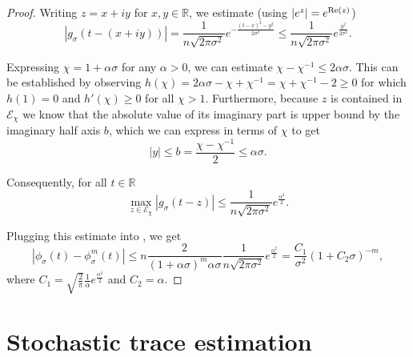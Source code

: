 \begin{proof}
    Writing $z = x + iy$ for $x,y \in \mathbb{R}$, we estimate (using $|e^z| = e^{\operatorname{Re}(z)}$)
    \begin{equation}
        |g_{\sigma}(t - (x + iy))| %
        = \frac{1}{n \sqrt{2 \pi \sigma^2}} e^{- \frac{(t - x)^2 - y^2}{2 \sigma^2}}
        \leq \frac{1}{n \sqrt{2 \pi \sigma^2}} e^{\frac{y^2}{2 \sigma^2}}.
    \end{equation}

    Expressing $\chi = 1 + \alpha \sigma$ for any $\alpha > 0$,
    we can estimate $\chi - \chi^{-1} \leq 2\alpha\sigma$.
    This can be established by observing
    $h(\chi) = 2\alpha\sigma - \chi + \chi^{-1} = \chi + \chi^{-1} - 2 \geq 0$
    for which $h(1) = 0$ and $h'(\chi) \geq 0$ for all $\chi > 1$.
    Furthermore, because $z$ is
    contained in $\mathcal{E}_{\chi}$ we know that the absolute value of its
    imaginary part is upper bound by the imaginary half axis $b$, which we can
    express in terms of $\chi$ to get 
    \begin{equation}
        |y| \leq b = \frac{\chi - \chi^{-1}}{2} \leq \alpha\sigma.
    \end{equation}

    Consequently, for all $t \in \mathbb{R}$
    \begin{equation}
        \max_{z \in \mathcal{E}_{\chi}} |g_{\sigma}(t - z)| 
        \leq \frac{1}{n \sqrt{2 \pi \sigma^2}} e^{\frac{\alpha^2}{2}}.
    \end{equation}

    Plugging this estimate into , we get
    \begin{equation}
        \left| \phi_{\sigma}(t) - \phi_{\sigma}^m(t) \right|
        \leq n \frac{2}{(1 + \alpha\sigma)^m\alpha \sigma} \frac{1}{n \sqrt{2 \pi \sigma^2}} e^{\frac{\alpha^2}{2}}
        = \frac{C_1}{\sigma^2} (1 + C_2 \sigma)^{-m},
    \end{equation}
    where $C_1=\sqrt{\frac{2}{\pi}}\frac{1}{\alpha}e^{\frac{\alpha^2}{2}}$ and $C_2=\alpha$.
\end{proof}


\section{Stochastic trace estimation}
\label{sec:2-chebyshev-stochastic-trace-estimation}

